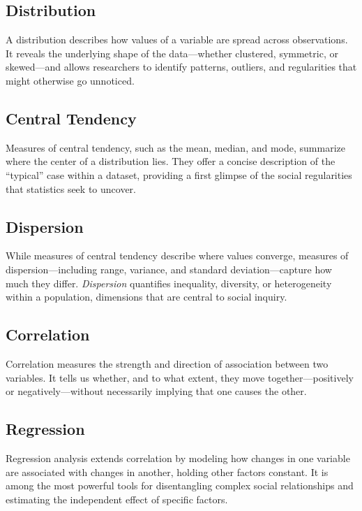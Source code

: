 \documentclass[
  letterpaper,
  DIV=11,
  numbers=noendperiod]{scrreprt}
\begin{document}
\subsection{Distribution}\label{distribution}

A distribution describes how values of a variable are spread across
observations. It reveals the underlying shape of the data---whether
clustered, symmetric, or skewed---and allows researchers to identify
patterns, outliers, and regularities that might otherwise go unnoticed.

\subsection{Central Tendency}\label{central-tendency}

Measures of central tendency, such as the mean, median, and mode,
summarize where the center of a distribution lies. They offer a concise
description of the ``typical'' case within a dataset, providing a first
glimpse of the social regularities that statistics seek to uncover.

\subsection{Dispersion}\label{dispersion}

While measures of central tendency describe where values converge,
measures of dispersion---including range, variance, and standard
deviation---capture how much they differ. \emph{Dispersion} quantifies
inequality, diversity, or heterogeneity within a population, dimensions
that are central to social inquiry.

\subsection{Correlation}\label{correlation}

Correlation measures the strength and direction of association between
two variables. It tells us whether, and to what extent, they move
together---positively or negatively---without necessarily implying that
one causes the other.

\subsection{Regression}\label{regression}

Regression analysis extends correlation by modeling how changes in one
variable are associated with changes in another, holding other factors
constant. It is among the most powerful tools for disentangling complex
social relationships and estimating the independent effect of specific
factors.
\end{document}
